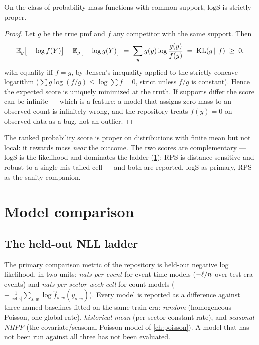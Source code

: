 \begin{proposition}\label{prop:ch07:logscore}
On the class of probability mass functions with common support,
$\mathrm{logS}$ is strictly proper.
\end{proposition}

\begin{proof}
Let $g$ be the true pmf and $f$ any competitor with the same support.
Then
\[
\mathbb{E}_g\big[-\log f(Y)\big] - \mathbb{E}_g\big[-\log g(Y)\big]
 \;=\; \sum_y g(y)\log\frac{g(y)}{f(y)}
 \;=\; \operatorname{KL}\!\left(g \,\middle\|\, f\right) \;\ge\; 0,
\]
with equality iff $f=g$, by Jensen's inequality applied to the strictly
concave logarithm ($\sum g\log(f/g) \le \log\sum f = 0$, strict unless
$f/g$ is constant). Hence the expected score is uniquely minimized at the
truth. If supports differ the score can be infinite --- which is a
feature: a model that assigns zero mass to an observed count is
infinitely wrong, and the repository treats $f(y)=0$ on observed data as
a bug, not an outlier.
\end{proof}

The ranked probability score is proper on distributions with finite mean
\citep{gneitingraftery2007,czado2009} but not local: it rewards mass
\emph{near} the outcome. The two scores are complementary --- logS is the
likelihood and dominates the ladder (\cref{ch07:sec:comparison}); RPS is
distance-sensitive and robust to a single mis-tailed cell --- and both are
reported, logS as primary, RPS as the sanity companion.

\section{Model comparison}\label{ch07:sec:comparison}

\subsection{The held-out NLL ladder}\label{ch07:sec:ladder}

The primary comparison metric of the repository is held-out negative log
likelihood, in two units: \emph{nats per event} for event-time models
($-\ell/n$ over test-era events) and \emph{nats per sector-week cell}
for count models ($-\frac{1}{|\text{cells}|}\sum_{s,w}\log
\hat f_{s,w}(y_{s,w})$). Every model is reported as a difference against
three named baselines fitted on the same train era: \emph{random}
(homogeneous Poisson, one global rate), \emph{historical-mean}
(per-sector constant rate), and \emph{seasonal NHPP} (the
covariate/seasonal Poisson model of \cref{ch:poisson}). A model that has
not been run against all three has not been evaluated.

